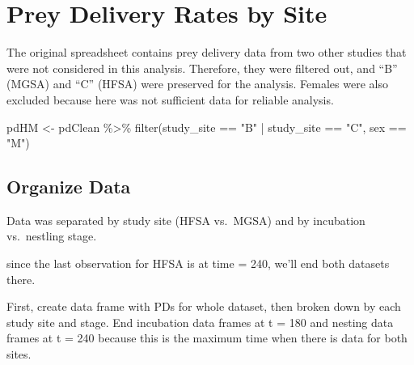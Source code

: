 \documentclass[
]{article}
\newenvironment{Shaded}{\begin{snugshade}}{\end{snugshade}}
\newcommand{\FunctionTok}[1]{\textcolor[rgb]{0.00,0.00,0.00}{#1}}
\newcommand{\NormalTok}[1]{#1}
\newcommand{\OtherTok}[1]{\textcolor[rgb]{0.56,0.35,0.01}{#1}}
\newcommand{\SpecialCharTok}[1]{\textcolor[rgb]{0.00,0.00,0.00}{#1}}
\newcommand{\StringTok}[1]{\textcolor[rgb]{0.31,0.60,0.02}{#1}}
\begin{document}
\hypertarget{prey-delivery-rates-by-site}{%
\section{Prey Delivery Rates by
Site}\label{prey-delivery-rates-by-site}}

The original spreadsheet contains prey delivery data from two other
studies that were not considered in this analysis. Therefore, they were
filtered out, and ``B'' (MGSA) and ``C'' (HFSA) were preserved for the
analysis. Females were also excluded because here was not sufficient
data for reliable analysis.

\begin{Shaded}
\begin{Highlighting}[]
\NormalTok{pdHM }\OtherTok{\textless{}{-}}\NormalTok{ pdClean }\SpecialCharTok{\%\textgreater{}\%}
  \FunctionTok{filter}\NormalTok{(study\_site }\SpecialCharTok{==} \StringTok{"B"} \SpecialCharTok{|}\NormalTok{ study\_site }\SpecialCharTok{==} \StringTok{"C"}\NormalTok{, sex }\SpecialCharTok{==} \StringTok{"M"}\NormalTok{)}
\end{Highlighting}
\end{Shaded}

\hypertarget{organize-data-1}{%
\subsection{Organize Data}\label{organize-data-1}}

Data was separated by study site (HFSA vs.~MGSA) and by incubation
vs.~nestling stage.

since the last observation for HFSA is at time = 240, we'll end both
datasets there.

First, create data frame with PDs for whole dataset, then broken down by
each study site and stage. End incubation data frames at t = 180 and
nesting data frames at t = 240 because this is the maximum time when
there is data for both sites.
\end{document}
